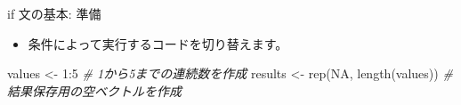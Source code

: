 \documentclass[
  ignorenonframetext,
]{beamer}
\newenvironment{Shaded}{\begin{snugshade}}{\end{snugshade}}
\newcommand{\CommentTok}[1]{\textcolor[rgb]{0.56,0.35,0.01}{\textit{#1}}}
\newcommand{\ConstantTok}[1]{\textcolor[rgb]{0.00,0.00,0.00}{#1}}
\newcommand{\DecValTok}[1]{\textcolor[rgb]{0.00,0.00,0.81}{#1}}
\newcommand{\FunctionTok}[1]{\textcolor[rgb]{0.00,0.00,0.00}{#1}}
\newcommand{\NormalTok}[1]{#1}
\newcommand{\OtherTok}[1]{\textcolor[rgb]{0.56,0.35,0.01}{#1}}
\newcommand{\SpecialCharTok}[1]{\textcolor[rgb]{0.00,0.00,0.00}{#1}}
\providecommand{\tightlist}{%
  \setlength{\itemsep}{0pt}\setlength{\parskip}{0pt}}
\begin{document}
\begin{frame}[fragile]{if 文の基本: 準備}
\protect\hypertarget{if-ux6587ux306eux57faux672c-ux6e96ux5099}{}
\begin{itemize}
\tightlist
\item
  条件によって実行するコードを切り替えます。
\end{itemize}

\scriptsize

\begin{Shaded}
\begin{Highlighting}[]
\NormalTok{values }\OtherTok{\textless{}{-}} \DecValTok{1}\SpecialCharTok{:}\DecValTok{5}                     \CommentTok{\# 1から5までの連続数を作成}
\NormalTok{results }\OtherTok{\textless{}{-}} \FunctionTok{rep}\NormalTok{(}\ConstantTok{NA}\NormalTok{, }\FunctionTok{length}\NormalTok{(values)) }\CommentTok{\# 結果保存用の空ベクトルを作成}
\end{Highlighting}
\end{Shaded}

\normalsize
\end{frame}
\end{document}
